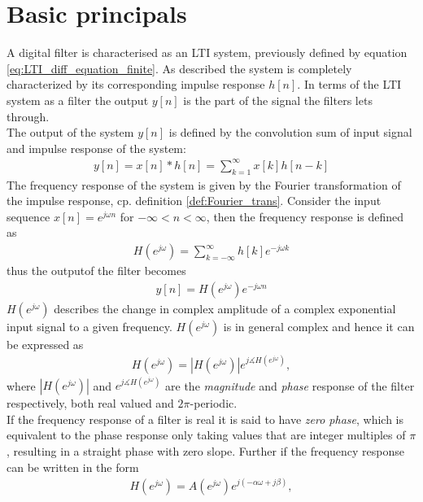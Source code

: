 \section{Basic principals}\label{sec:basic_filter}
A digital filter is characterised as an LTI system, previously defined by equation \eqref{eq:LTI_diff_equation_finite}. As described the system is completely characterized by its corresponding impulse response $h[n]$. In terms of the LTI system as a filter the output $y[n]$ is the part of the signal the filters lets through. \\
The output of the system $y[n]$ is defined by the convolution sum of input signal and impulse response of the system: \cite{DTSP, p. 26}
\begin{align}
y[n] = x[n]*h[n] = \sum_{k=1}^{\infty} x[k]h[n-k]
\end{align}    
The frequency response of the system is given by the Fourier transformation of the impulse response, cp. definition \ref{def:Fourier_trans}. Consider the input sequence $x[n]=e^{j\omega n}$ for $-\infty < n <\infty$, then the frequency response is defined as
\begin{align}\label{eq:freq_res}
H(e^{j\omega})=\sum_{k=-\infty}^{\infty}h[k]e^{-j\omega k}
\end{align}
thus the outputof the filter becomes 
\begin{align}
y[n]=H(e^{j\omega})e^{-j\omega n} \label{eq:filter_output}
\end{align} 
$H(e^{j\omega})$ describes the change in complex amplitude of a complex exponential input signal to a given frequency. $H(e^{j\omega})$ is in general complex and hence it can be expressed as
\begin{align}
H(e^{j\omega})=|H(e^{j\omega})|e^{j\measuredangle H(e^{j\omega})},
\end{align}  
where $|H(e^{j\omega})|$ and $e^{j\measuredangle H(e^{j\omega})}$ are the \textit{magnitude} and \textit{phase} response of the filter respectively, both real valued and $2\pi$-periodic.\\ 
If the frequency response of a filter is real it is said to have \textit{zero phase}, which is equivalent to the phase response only taking values that are integer multiples of $\pi$, resulting in a straight phase with zero slope. Further if the frequency response can be written in the form 
\begin{align}\label{eq:lin_pha}
H(e^{j\omega})=A(e^{j\omega})e^{j(-\alpha\omega + j\beta)} ,
\end{align}
